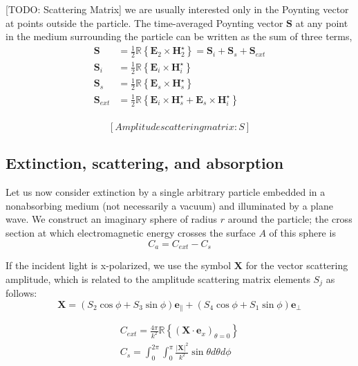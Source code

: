 [TODO: Scattering Matrix] 
we are usually interested only in the Poynting vector at points outside the particle. The time-averaged Poynting vector $\mathbf{S}$ at any point in the medium surrounding the particle can be written as the sum of three terms,
\begin{align}
    \mathbf{S} &= \frac{1}{2}\mathbb{R}\left\{\mathbf{E}_2\times\mathbf{H}^\star_2\right\} = \mathbf{S}_i + \mathbf{S}_s + \mathbf{S}_{ext} \\
    \mathbf{S}_i &= \frac{1}{2}\mathbb{R}\left\{\mathbf{E}_i\times\mathbf{H}^\star_i\right\} \\ 
    \mathbf{S}_s &= \frac{1}{2}\mathbb{R}\left\{\mathbf{E}_s\times\mathbf{H}^\star_s\right\} \\ 
    \mathbf{S}_{ext} &= \frac{1}{2}\mathbb{R}\left\{\mathbf{E}_i\times\mathbf{H}^\star_s + \mathbf{E}_s\times\mathbf{H}^\star_i \right\} \\ 
\end{align}

    $$[Amplitude scattering matrix: S]$$

\subsection{Extinction, scattering, and absorption}
\label{subsec:crosssection}
Let us now consider extinction by a single arbitrary particle embedded in a nonabsorbing medium (not necessarily a vacuum) and illuminated by a plane wave. We construct an imaginary sphere of radius $r$ around the particle; the cross section at which electromagnetic energy crosses the surface $A$ of
this sphere is 
\begin{equation}
    C_a = C_{ext} - C_s
\end{equation}

If the incident light is x-polarized, we use the symbol $\mathbf{X}$ for the vector scattering amplitude, which is related to the amplitude scattering matrix elements $S_j$ as follows:
\begin{equation}
    \mathbf{X} = (S_2\cos\phi + S_3\sin\phi)\mathbf{e}_{\parallel} + (S_4\cos\phi + S_1\sin\phi)\mathbf{e}_{\perp}
\end{equation}

\begin{align}
    C_{ext} = \frac{4\pi}{k^2}\mathbb{R}\left\{(\mathbf{X}\cdot\mathbf{e}_x)_{\theta=0}\right\} \\
    C_s = \int_0^{2\pi}\int_0^{\pi}\frac{|\mathbf{X}|^2}{k^2}\sin\theta d\theta d\phi
\end{align}

